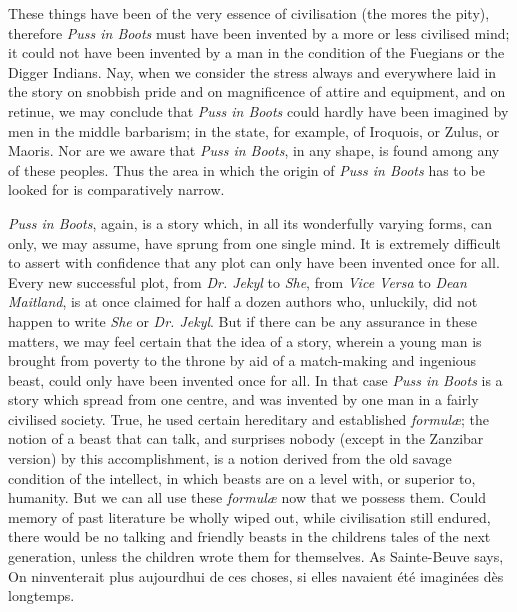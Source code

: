 \documentclass[14pt,a4paper]{memoir}
\begin{document}
{These things have been of the very essence of civilisation (the
more\textquotesingle s the pity), therefore \emph{Puss in Boots} must
have been invented by a more or less civilised mind; it could not have
been invented by a man in the condition of the Fuegians or the Digger
Indians. Nay, when we consider the stress always and everywhere laid in
the story on snobbish pride and on magnificence of attire and equipment,
and on retinue, we may conclude that \emph{Puss in Boots} could hardly
have been imagined by men in the middle barbarism; in the state, for
example, of Iroquois, or Zulus, or Maoris. Nor are we aware that
\emph{Puss in Boots}, in any shape, is found among any of these peoples.
Thus the area in which the origin of \emph{Puss in Boots} has to be
looked for is comparatively narrow.

\emph{Puss in Boots}, again, is a story which, in all its wonderfully
varying forms, can only, we may assume, have sprung from one single
mind. It is extremely difficult to assert with confidence that any plot
can only have been invented once for all. Every new successful plot,
from \emph{Dr. Jekyl} to \emph{She}, from \emph{Vice Versa} to
\emph{Dean Maitland}, is at once claimed for half a dozen authors who,
unluckily, did not happen to write \emph{She} or \emph{Dr. Jekyl}. But
if there can be any assurance in these matters, we may feel certain that
the idea of a story, wherein a young man is brought from poverty to the
throne by aid of a match-making and ingenious beast, could only have
been invented once for all. In that case \emph{Puss in Boots} is a story
which spread from one centre, and was invented by one man in a fairly
civilised society. True, he used certain hereditary and established
\emph{formulæ}; the notion of a beast that can talk, and surprises
nobody (except in the Zanzibar version) by this accomplishment, is a
notion derived from the old savage condition of the intellect, in which
beasts are on a level with, or superior to, humanity. But we can all use
these \emph{formulæ} now that we possess them. Could memory of past
literature be wholly wiped out, while civilisation still endured, there
would be no talking and friendly beasts in the
children\textquotesingle s tales of the next generation, unless the
children wrote them for themselves. As Sainte-Beuve says,
\textquotesingle On n\textquotesingle inventerait plus
aujourd\textquotesingle hui de ces choses, si elles
n\textquotesingle avaient été imaginées dès
longtemps.\textquotesingle{}

}
\end{document}
